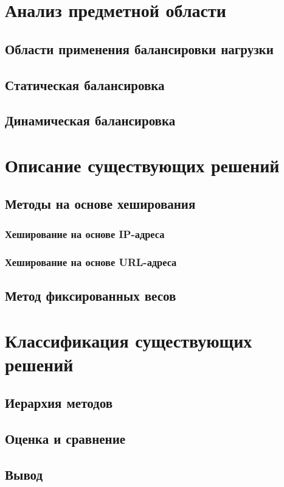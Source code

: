 \section{Анализ предметной области}

\subsection{Области применения балансировки нагрузки}

\subsection*{Статическая балансировка}

\subsection*{Динамическая балансировка}

\section{Описание существующих решений}


\subsection{Методы на основе хеширования}

\subsubsection{Хеширование на основе IP-адреса}

\subsubsection{Хеширование на основе URL-адреса}

\subsection{Метод фиксированных весов}

\section{Классификация существующих решений}

\subsection{Иерархия методов}

\subsection{Оценка и сравнение}

\subsection{Вывод}
